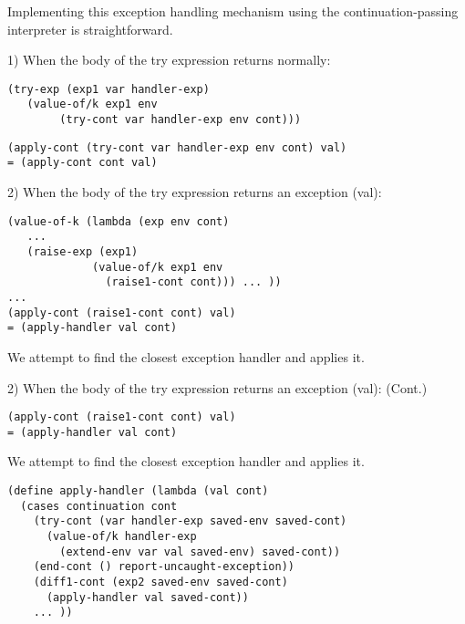 \documentclass{article}
\begin{document}
\begin{huge}

Implementing this exception handling mechanism using the continuation-passing interpreter is straightforward.

1) When the body of the try expression returns normally:
\begin{lstlisting}
(try-exp (exp1 var handler-exp)
   (value-of/k exp1 env
        (try-cont var handler-exp env cont)))
\end{lstlisting}

\begin{lstlisting}
(apply-cont (try-cont var handler-exp env cont) val)
= (apply-cont cont val)
\end{lstlisting}


2) When the body of the try expression returns an exception (val):

\begin{lstlisting}
(value-of-k (lambda (exp env cont) 
   ...
   (raise-exp (exp1)
             (value-of/k exp1 env
               (raise1-cont cont))) ... ))
...
(apply-cont (raise1-cont cont) val)
= (apply-handler val cont)
\end{lstlisting}

We attempt to find the closest exception handler and applies it.


2) When the body of the try expression returns an exception (val): (Cont.)

\begin{lstlisting}
(apply-cont (raise1-cont cont) val)
= (apply-handler val cont)
\end{lstlisting}

We attempt to find the closest exception handler and applies it.

\begin{lstlisting}
(define apply-handler (lambda (val cont)
  (cases continuation cont
    (try-cont (var handler-exp saved-env saved-cont)
      (value-of/k handler-exp 
        (extend-env var val saved-env) saved-cont))
    (end-cont () report-uncaught-exception))
    (diff1-cont (exp2 saved-env saved-cont) 
      (apply-handler val saved-cont))
    ... ))
\end{lstlisting}


\end{huge}
\end{document}
